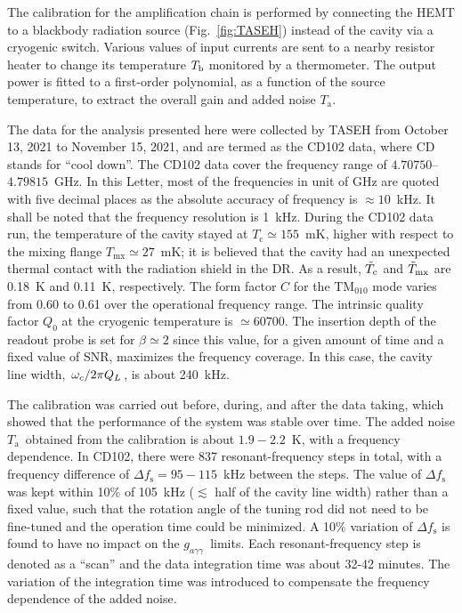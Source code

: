 \documentclass[%
 reprint,prl, %
superscriptaddress,
nobibnotes,
 amsmath,amssymb,
 aps,
]{revtex4-2}
\newcommand{\bgagg}{\ensuremath{g_{a\gamma\gamma}}}
\newcommand{\ta}{\ensuremath{T_\text{a}}}
\newcommand{\flo}{\ensuremath{4.70750}}
\newcommand{\fhi}{\ensuremath{4.79815}}
\newcommand{\noise}{\ensuremath{1.9 - 2.2}}
\begin{document}
The calibration for the amplification chain is performed by 
connecting the HEMT to a blackbody radiation source (Fig.~\ref{fig:TASEH}) 
instead of the cavity via a cryogenic switch.  
Various values of input currents are sent to a nearby resistor heater  
to change its temperature $T_{\text b}$ monitored by a thermometer. 
The output power is fitted to a first-order polynomial, as a function of
the source temperature, to extract the overall gain and added noise \ta. 


The data for the analysis presented here were collected by TASEH 
from October 13, 2021 to November 15, 2021, and are termed as the CD102 data, 
where CD stands for ``cool down''. 
The CD102 data cover the frequency range of \flo--\fhi~GHz. In this Letter, 
most of the frequencies in unit of GHz are quoted with five decimal places as 
the absolute accuracy of frequency is $\approx 10$~kHz. It shall be noted 
that the frequency resolution is 1~kHz.  
During the CD102 data run, 
the temperature of the cavity stayed at $T_\text{c}\simeq155$~mK, higher 
with respect to the mixing flange $T_\text{mx}\simeq27$~mK; it is believed 
that the cavity had an 
unexpected thermal contact with the radiation shield in the DR. 
As a result, $\Tilde{T}_\text{c}$ and $\Tilde{T}_\text{mx}$ 
are 0.18~K and 0.11~K, respectively. 
The form factor $C$ for 
the TM$_{010}$ mode varies from 0.60 to 0.61 over the operational 
frequency range. The intrinsic quality factor $Q_0$ at the cryogenic 
temperature is $\simeq 60700$. 
The insertion depth of the readout probe is set for 
$\beta\simeq2$ since this value, for a given amount 
of time and a fixed value of SNR, maximizes the frequency coverage. 
In this case, 
the cavity line width, $\left.\omega_c\middle/2\pi Q_L\right.$, is about 
240~kHz. 

The calibration was carried out before, during, and after the data taking,
which showed that the performance of the system was stable over time. 
The added noise \ta\ obtained from the calibration is 
about \noise~K, with a frequency dependence. In CD102, 
there were 837 resonant-frequency steps in total, with a frequency difference 
of $\Delta f_\text{s}=95-115$~kHz between the steps. The value of 
$\Delta f_\text{s}$ was kept within 10\% of 105~kHz ($\lesssim$ half of the 
cavity line width) rather than 
a fixed value, such that the rotation angle of the tuning rod did not need to 
be fine-tuned and the operation time could be minimized. A 10\% variation of 
$\Delta f_\text{s}$ is found to have no impact on the \bgagg\ limits. 
Each resonant-frequency step is denoted as a ``scan'' 
and the data integration time was about 32-42 minutes. 
The variation of the integration time was introduced to compensate 
the frequency dependence of the added noise. 
\end{document}
